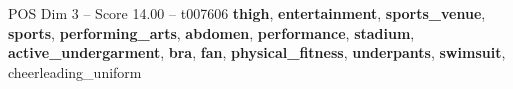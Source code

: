 \begin{textsample}{POS Dim 3 – Score 14.00 – t007606}  \label{ex:f3_pos_033}
\textbf{thigh}, \textbf{entertainment}, \textbf{sports\_venue}, \textbf{sports}, \textbf{performing\_arts}, \textbf{abdomen}, \textbf{performance}, \textbf{stadium}, \textbf{active\_undergarment}, \textbf{bra}, \textbf{fan}, \textbf{physical\_fitness}, \textbf{underpants}, \textbf{swimsuit}, cheerleading\_uniform

\end{textsample}
